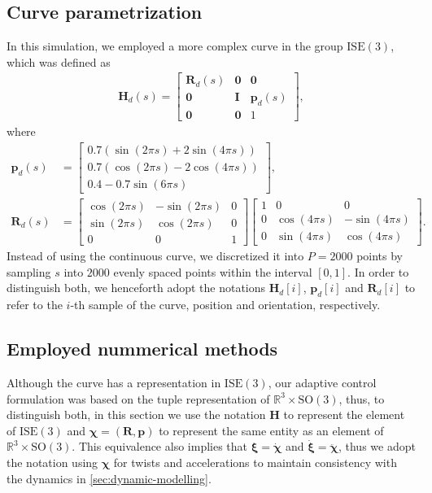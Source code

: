 \subsection{Curve parametrization}
In this simulation, we employed a more complex curve in the group $\text{ISE}(3)$, which was defined as
\begin{align}
    \mathbf{H}_d(s) = \begin{bmatrix}
        \mathbf{R}_d(s) & \mathbf{0} & \mathbf{0}\\
        \mathbf{0} & \mathbf{I} & \mathbf{p}_d(s)\\
        \mathbf{0} & \mathbf{0} & 1
    \end{bmatrix},\label{eq:parametriceq-simulation}
\end{align}
where
\begin{align}
    \mathbf{p}_d(s) &= \begin{bmatrix}
        0.7(\sin(2\pi s) + 2\sin(4\pi s))\\
        0.7(\cos(2\pi s) - 2\cos(4\pi s))\\
        0.4 - 0.7\sin(6\pi s)
    \end{bmatrix},\\
    \mathbf{R}_d(s) &= \begin{bmatrix}
        \cos(2\pi s) & -\sin(2\pi s) & 0\\
        \sin(2\pi s) & \cos(2\pi s) & 0\\
        0 & 0 & 1
    \end{bmatrix}\begin{bmatrix}
        1 & 0 & 0\\
        0 & \cos(4\pi s) & -\sin(4\pi s)\\
        0 & \sin(4\pi s) & \cos(4\pi s)
    \end{bmatrix}.
\end{align}
Instead of using the continuous curve, we discretized it into $P=\num{2000}$ points by sampling $s$ into $\num{2000}$ evenly spaced points within the interval $[0, 1]$. In order to distinguish both, we henceforth adopt the notations $\mathbf{H}_d[i]$, $\mathbf{p}_d[i]$ and $\mathbf{R}_d[i]$ to refer to the $i$-th sample of the curve, position and orientation, respectively.
\subsection{Employed nummerical methods}\label{sec:results-adaptive-nummerical-methods}
Although the curve has a representation in $\text{ISE}(3)$, our adaptive control formulation was based on the tuple representation of $\mathbb{R}^3\times \text{SO}(3)$, thus, to distinguish both, in this section we use the notation $\mathbf{H}$ to represent the element of $\text{ISE}(3)$ and $\boldsymbol{\chi}=(\mathbf{R}, \mathbf{p})$ to represent the same entity as an element of $\mathbb{R}^3\times \text{SO}(3)$. This equivalence also implies that $\boldsymbol{\xi}=\dot{\boldsymbol{\chi}}$ and $\dot{\boldsymbol{\xi}} = \ddot{\boldsymbol{\chi}}$, thus we adopt the notation using $\boldsymbol{\chi}$ for twists and accelerations to maintain consistency with the dynamics in \cref{sec:dynamic-modelling}.

